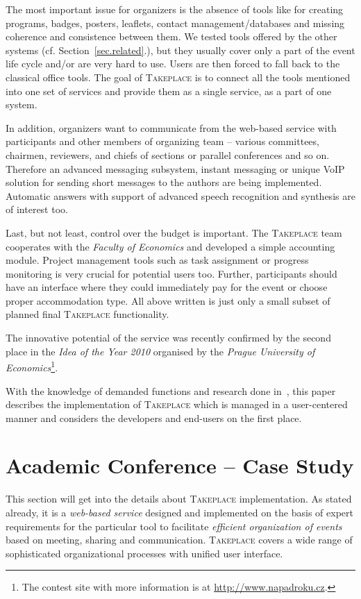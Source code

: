 \documentclass[conference]{IEEEtran}
\newcommand\tp{\textsc{Takeplace}\xspace}
\begin{document}
The most important issue for organizers is the absence of tools like for
creating programs, badges, posters, leaflets, contact management/databases and
missing coherence and consistence between them. We tested tools offered by the
other systems (cf. Section~\ref{sec.related}.), but they usually cover only a
part of the event life cycle and/or are very hard to use. Users are then
forced to fall back to the classical office tools. The goal of \tp is to
connect all the tools mentioned into one set of services and provide them as a
single service, as a part of one system.

In addition, organizers want to communicate from the web-based service with
participants and other members of organizing team -- various committees,
chairmen, reviewers, and chiefs of sections or parallel conferences and so on.
Therefore an advanced messaging subsystem, instant messaging or unique VoIP
solution for sending short messages to the authors are being implemented.
Automatic answers with support of advanced speech recognition and synthesis
are of interest too.

Last, but not least, control over the budget is important. The \tp team
cooperates with the \emph{Faculty of Economics} and developed a simple
accounting module. Project management tools such as task assignment or
progress monitoring is very crucial for potential users too. Further,
participants should have an interface where they could immediately pay for the
event or choose proper accommodation type. All above written is just only a
small subset of planned final \tp functionality.

The innovative potential of the service was recently confirmed by the second
place in the \emph{Idea of the Year 2010} organised by the \emph{Prague
University of Economics}\footnote{The contest site with more information is at
\url{http://www.napadroku.cz}.}.

With the knowledge of demanded functions and research done
in~\cite{user-centered2010}, this paper describes the implementation of \tp
which is managed in a user-centered manner and considers the developers and
end-users on the first place.

\section{Academic Conference -- Case Study}
This section will get into the details about \tp implementation. As stated
already, it is a \emph{web-based service} designed and implemented on the
basis of expert requirements for the particular tool to facilitate
\emph{efficient organization of events} based on meeting, sharing and
communication. \tp covers a wide range of sophisticated organizational
processes with unified user interface.
\end{document}

